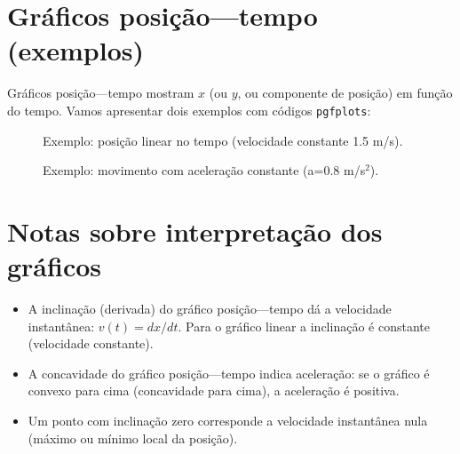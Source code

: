 \documentclass[a4paper,12pt]{article}
\begin{document}
	\section{Gráficos posição---tempo (exemplos)}
	Gráficos posição---tempo mostram $x$ (ou $y$, ou componente de posição) em função do tempo. Vamos apresentar dois exemplos com códigos \texttt{pgfplots}:
	\begin{figure}[H]
		\centering
		\caption{Exemplo: posição linear no tempo (velocidade constante 1.5 m/s).}
	\end{figure}
	
	\begin{figure}[H]
		\centering
		\caption{Exemplo: movimento com acelera\c{c}\~ao constante (a=0.8 m/s$^2$).}
	\end{figure}
	
	\section{Notas sobre interpretação dos gráficos}
	\begin{itemize}
		\item A inclinação (derivada) do gráfico posição---tempo dá a velocidade instantânea: $v(t)=dx/dt$. Para o gráfico linear a inclinação é constante (velocidade constante).
		\item A concavidade do gráfico posição---tempo indica aceleração: se o gráfico é convexo para cima (concavidade para cima), a aceleração é positiva.
		\item Um ponto com inclinação zero corresponde a velocidade instantânea nula (máximo ou mínimo local da posição).
	\end{itemize}
	
\end{document}
